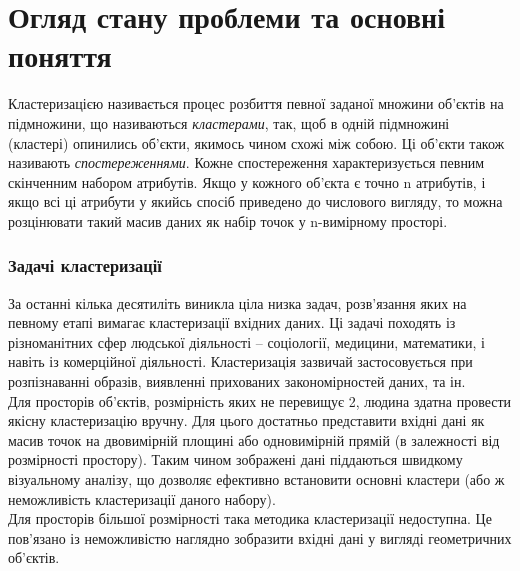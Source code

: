 \chapter{Огляд стану проблеми та основні поняття}\label{ch:01}

Кластеризацією називається процес розбиття певної заданої множини об'єктів на підмножини, що називаються \textit{кластерами}, так, щоб в одній підмножині (кластері) опинились об'єкти, якимось чином схожі між собою. Ці об'єкти також називають \textit{спостереженнями}.
Кожне спостереження характеризується певним скінченним набором атрибутів. Якщо у кожного об'єкта є точно n атрибутів, і якщо всі ці атрибути у якийсь спосіб приведено до числового вигляду, то можна розцінювати такий масив даних як набір точок у n-вимірному просторі.
\subsection{Задачі кластеризації}
За останні кілька десятиліть виникла ціла низка задач, розв'язання яких на певному етапі вимагає кластеризації вхідних даних. Ці задачі походять із різноманітних сфер людської діяльності -- соціології, медицини, математики, і навіть із комерційної діяльності. Кластеризація зазвичай застосовується при розпізнаванні образів, виявленні прихованих закономірностей даних, та ін. 
\\
Для просторів об'єктів, розмірність яких не перевищує 2, людина здатна провести якісну кластеризацію вручну. Для цього достатньо представити вхідні дані як масив точок на двовимірній площині або одновимірній прямій (в залежності від розмірності простору). Таким чином зображені дані піддаються швидкому візуальному аналізу, що дозволяє ефективно встановити основні кластери (або ж неможливість кластеризації даного набору).
\\
Для просторів більшої розмірності така методика кластеризації недоступна. Це пов'язано із неможливістю наглядно зобразити вхідні дані у вигляді геометричних об'єктів.

